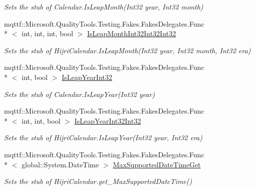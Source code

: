 \begin{DoxyCompactItemize}
\begin{DoxyCompactList}\small\item\em Sets the stub of Calendar.\-Is\-Leap\-Month(\-Int32 year, Int32 month)\end{DoxyCompactList}\item 
mqttf\-::\-Microsoft.\-Quality\-Tools.\-Testing.\-Fakes.\-Fakes\-Delegates.\-Func\\*
$<$ int, int, int, bool $>$ \hyperlink{class_system_1_1_globalization_1_1_fakes_1_1_stub_hijri_calendar_ae07fb31d94c4b3ef7761db1e1b363b29}{Is\-Leap\-Month\-Int32\-Int32\-Int32}
\begin{DoxyCompactList}\small\item\em Sets the stub of Hijri\-Calendar.\-Is\-Leap\-Month(\-Int32 year, Int32 month, Int32 era)\end{DoxyCompactList}\item 
mqttf\-::\-Microsoft.\-Quality\-Tools.\-Testing.\-Fakes.\-Fakes\-Delegates.\-Func\\*
$<$ int, bool $>$ \hyperlink{class_system_1_1_globalization_1_1_fakes_1_1_stub_hijri_calendar_a6e332e2735c2489bbc602ef55c2c5750}{Is\-Leap\-Year\-Int32}
\begin{DoxyCompactList}\small\item\em Sets the stub of Calendar.\-Is\-Leap\-Year(\-Int32 year)\end{DoxyCompactList}\item 
mqttf\-::\-Microsoft.\-Quality\-Tools.\-Testing.\-Fakes.\-Fakes\-Delegates.\-Func\\*
$<$ int, int, bool $>$ \hyperlink{class_system_1_1_globalization_1_1_fakes_1_1_stub_hijri_calendar_a0e798a83f9023d8738569ca2e6a70add}{Is\-Leap\-Year\-Int32\-Int32}
\begin{DoxyCompactList}\small\item\em Sets the stub of Hijri\-Calendar.\-Is\-Leap\-Year(\-Int32 year, Int32 era)\end{DoxyCompactList}\item 
mqttf\-::\-Microsoft.\-Quality\-Tools.\-Testing.\-Fakes.\-Fakes\-Delegates.\-Func\\*
$<$ global\-::\-System.\-Date\-Time $>$ \hyperlink{class_system_1_1_globalization_1_1_fakes_1_1_stub_hijri_calendar_a309b7c0ffa1c82dcf8937467ea0ebdf4}{Max\-Supported\-Date\-Time\-Get}
\begin{DoxyCompactList}\small\item\em Sets the stub of Hijri\-Calendar.\-get\-\_\-\-Max\-Supported\-Date\-Time()\end{DoxyCompactList}\item 

\end{DoxyCompactItemize}
